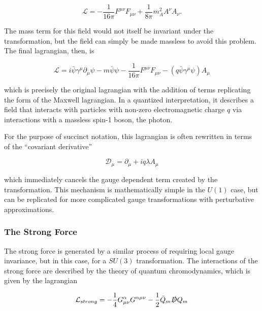 \begin{equation}
\mathcal{L} = -\frac{1}{16\pi}F^{\mu\nu}F_{\mu\nu} + \frac{1}{8\pi}m_A^2A^\nu A_\nu . 
\end{equation}

The mass term for this field would not itself be invariant under the transformation, but the field can simply be made massless to avoid this problem. The final lagrangian, then, is 

\begin{equation}
\mathcal{L} = i\bar{\psi}\gamma^\mu \partial_\mu\psi - m \bar{\psi}\psi -\frac{1}{16\pi}F^{\mu\nu}F_{\mu\nu} - (q\bar{\psi}\gamma^\mu\psi)A_\mu
\label{eq:l_em}
\end{equation}

which is precisely the original lagrangian with the addition of terms replicating the form of the Maxwell lagrangian. In a quantized interpretation, it describes a field that interacts with particles with non-zero electromagnetic charge $q$ via interactions with a massless spin-1 boson, the photon. 

For the purpose of succinct notation, this lagrangian is often rewritten in terms of the ``covariant derivative''

\begin{equation}
\mathcal{D}_\mu = \partial_\mu + iq\lambda A_\mu
\end{equation}

which immediately cancels the gauge dependent term created by the transformation. This mechanism is mathematically simple in the $U(1)$ case, but can be replicated for more complicated gauge transformations with perturbative approximations. 


\subsubsection{The Strong Force}
\label{sec:strong}

The strong force is generated by a similar process of requiring local gauge invariance, but in this case, for a $SU(3)$ transformation. The interactions of the strong force are described by the theory of quantum chromodynamics, which is given by the lagrangian

\begin{equation}
\mathcal{L}_{strong} = -\frac{1}{4}G^\alpha_{\mu\nu}G^{\alpha\mu\nu} - \frac{1}{2}\bar{Q}_m \slashed{D} Q_m
\end{equation}

